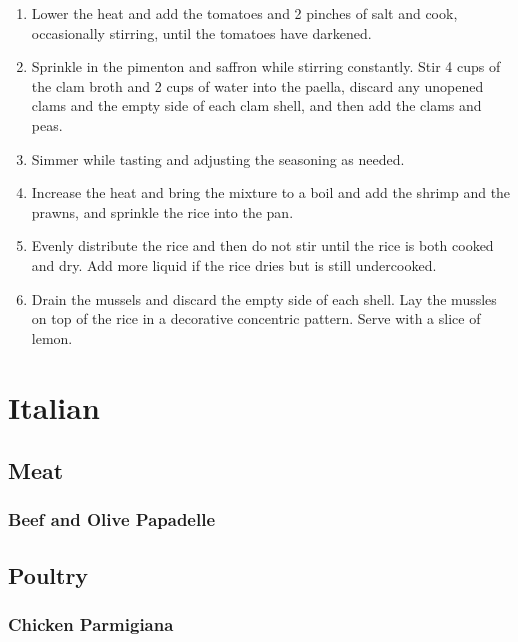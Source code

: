 \documentclass[a4paper, oneside]{book}
\begin{document}
\begin{multicols}{2}
{\begin{enumerate}
        \item
            Lower the heat and add the tomatoes and 2 pinches of salt
            and cook, occasionally stirring, until the tomatoes have darkened.
        \item
            Sprinkle in the pimenton and saffron while stirring constantly.
            Stir 4 cups of the clam broth and 2 cups of water into the paella,
            discard any unopened clams and the empty side of each clam shell,
            and then add the clams and peas.
        \item
            Simmer while tasting and adjusting the seasoning as needed.
        \item 
            Increase the heat and bring the mixture to a boil and add the
            shrimp and the prawns, and sprinkle the rice into the pan.
        \item
            Evenly distribute the rice and then do not stir until the rice
            is both cooked and dry. Add more liquid if the rice dries but is
            still undercooked.
        \item
            Drain the mussels and discard the empty side of each shell. Lay the
            mussles on top of the rice in a decorative concentric pattern.
            Serve with a slice of lemon.
    \end{enumerate}}

\end{multicols}

\chapter{Italian}

\section{Meat}

\subsection{Beef and Olive Papadelle}

\section{Poultry}

\subsection{Chicken Parmigiana}
\end{document}
